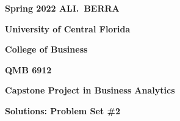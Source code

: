 \documentclass[12pt]{book}
\begin{document}
\pagestyle{empty}



{\noindent\bf Spring 2022 \hfill ALI.~BERRA}



\vskip 16pt



\centerline{\bf University of Central Florida}



\centerline{\bf College of Business}



\vskip 16pt



\centerline{\bf QMB 6912}



\centerline{\bf Capstone Project in Business Analytics}



\vskip 10pt



\centerline{\bf Solutions: Problem Set \#2}
\end{document}
